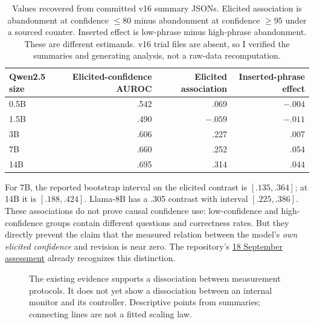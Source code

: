 \documentclass[11pt]{article}
\newcommand{\repo}[2]{\href{https://github.com/ANONYMIZED/reality-monitoring/blob/d2e42b3f64483a48ee2b87c371f03957a0ddcce2/#1}{#2}}
\begin{document}
\begin{table}[h]
\centering\small
\begin{tabular}{lrrr}
\toprule
Qwen2.5 size & Elicited-confidence AUROC & Elicited association & Inserted-phrase effect\\
\midrule
0.5B & .542 & .069 & $-.004$\\
1.5B & .490 & $-.059$ & $-.011$\\
3B & .606 & .227 & .007\\
7B & .660 & .252 & .054\\
14B & .695 & .314 & .044\\
\bottomrule
\end{tabular}
\caption{Values recovered from committed v16 summary JSONs. Elicited association is abandonment at confidence $\leq80$ minus abandonment at confidence $\geq95$ under a sourced counter. Inserted effect is low-phrase minus high-phrase abandonment. These are different estimands. v16 trial files are absent, so I verified the summaries and generating analysis, not a raw-data recomputation.}
\end{table}

For 7B, the reported bootstrap interval on the elicited contrast is $[.135,.364]$; at 14B it is $[.188,.424]$. Llama-8B has a .305 contrast with interval $[.225,.386]$. These associations do not prove causal confidence use: low-confidence and high-confidence groups contain different questions and correctness rates. But they directly prevent the claim that the measured relation between the model's \emph{own elicited confidence} and revision is near zero. The repository's \repo{docs/ASSESSMENT_2026-09-18.md}{18 September assessment} already recognizes this distinction.

\begin{figure}[h]
\centering
{}
\caption{The existing evidence supports a dissociation between measurement protocols. It does not yet show a dissociation between an internal monitor and its controller. Descriptive points from summaries; connecting lines are not a fitted scaling law.}
\end{figure}
\end{document}
